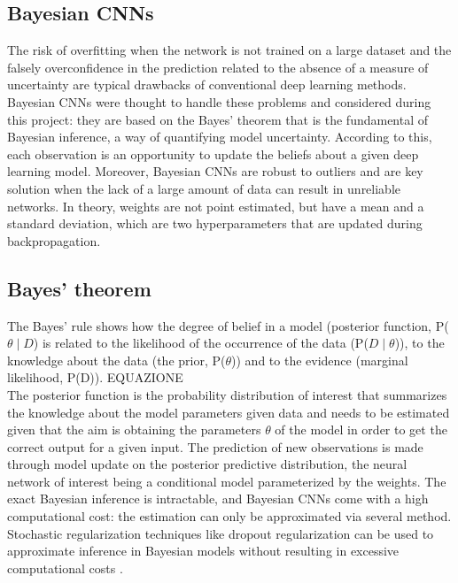 \documentclass[12pt]{article}
\begin{document}
\subsection{Bayesian CNNs}
The risk of overfitting when the network is not trained on a large dataset and the falsely overconfidence in the prediction related to the absence of a measure of uncertainty are typical drawbacks of conventional deep learning methods. 
Bayesian CNNs were thought to handle these problems and considered during this project: they are based on the Bayes’ theorem that is the fundamental of Bayesian inference, a way of quantifying model uncertainty. According to this, each observation is an opportunity to update the beliefs about a given deep learning model. Moreover, Bayesian CNNs are robust to outliers and are key solution when the lack of a large amount of data can result in unreliable networks. \cite{bay1} In theory, weights are not point estimated, but have a mean and a standard deviation, which are two hyperparameters that are updated during backpropagation.  
\subsection{Bayes' theorem}
The Bayes’ rule shows how the degree of belief in a model (posterior function, P($\theta \mid D$) is related to the likelihood of the occurrence of the data (P($D \mid \theta$)), to the knowledge about the data (the prior, P($\theta$)) and to the evidence (marginal likelihood, P(D)). EQUAZIONE \\
The posterior function is the probability distribution of interest that summarizes the knowledge about the model parameters given data and needs to be estimated given that the aim is obtaining the parameters $\theta$ of the model in order to get the correct output for a given input. The prediction of new observations is made through model update on the posterior predictive distribution, the neural network of interest being a conditional model parameterized by the weights.
The exact Bayesian inference is intractable, and Bayesian CNNs come with a high computational cost: the estimation can only be approximated via several method.\\
Stochastic regularization techniques like dropout regularization can be used to approximate inference in Bayesian models without resulting in excessive computational costs \cite{bay1}.
\end{document}
